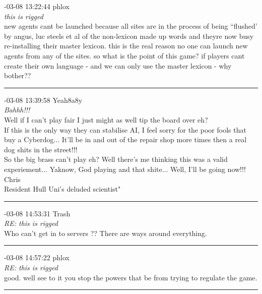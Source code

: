 \begin{mail}


{-03-08 13:22:44 phlox}\\
{\itshape this is rigged}\\
new agents cant be launched because all sites are in the process of being ``flushed' by angus, luc steels et al 
of the non-lexicon made up words and theyre now busy re-installing their master lexicon. this is the real reason 
no one can launch new agents from any of the sites. so what is the point of this game? if players 
cant create their own language - and we can only use the master lexicon - why bother??\\

\rule{0.8\textwidth}{.4pt}

{-03-08 13:39:58 Yeah8a8y}\\
{\it	Bahhh!!!}\\
Well if I can't play fair I just might as well tip the board over eh?\\
If this is the only way they can stabilise AI, I feel sorry for the poor fools that buy a Cyberdog... It'll  be in and out of the repair shop more times then a real dog shits in the street!!!\\
So the big brass can't play eh? Well there's me thinking this was a valid experiement... Yaknow, God playing and that shite... Well, I'll be going now!!!\\
Chris\\
Resident Hull Uni's deluded scientist"\\

\rule{0.8\textwidth}{.4pt}

{-03-08 14:53:31 Trash}\\
{\itshape RE: this is rigged}\\
Who can't get in to servers ?? 	There are ways around everything.\\

\rule{0.8\textwidth}{.4pt}

{-03-08 14:57:22 phlox}\\
{\itshape RE: this is rigged}\\
good. well see to it you stop the powers that be from trying to regulate the game.\\

\rule{0.8\textwidth}{.4pt}


\end{mail}
